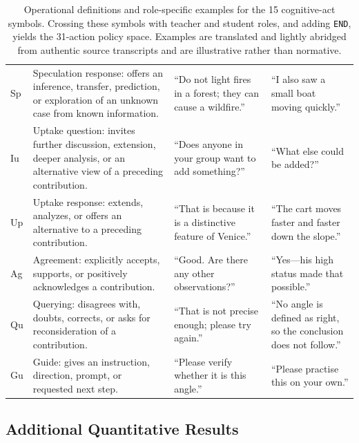 \documentclass[manuscript,review,anonymous]{acmart}
\begin{document}
\begin{table}[t]
\begin{tabularx}{\textwidth}{@{}l>{\raggedright\arraybackslash}p{}>{\raggedright\arraybackslash}p{}>{\raggedright\arraybackslash}X@{}}
Sp & Speculation response: offers an inference, transfer, prediction, or exploration of an unknown case from known information. & ``Do not light fires in a forest; they can cause a wildfire.'' & ``I also saw a small boat moving quickly.'' \\
Iu & Uptake question: invites further discussion, extension, deeper analysis, or an alternative view of a preceding contribution. & ``Does anyone in your group want to add something?'' & ``What else could be added?'' \\
Up & Uptake response: extends, analyzes, or offers an alternative to a preceding contribution. & ``That is because it is a distinctive feature of Venice.'' & ``The cart moves faster and faster down the slope.'' \\
Ag & Agreement: explicitly accepts, supports, or positively acknowledges a contribution. & ``Good. Are there any other observations?'' & ``Yes---his high status made that possible.'' \\
Qu & Querying: disagrees with, doubts, corrects, or asks for reconsideration of a contribution. & ``That is not precise enough; please try again.'' & ``No angle is defined as right, so the conclusion does not follow.'' \\
Gu & Guide: gives an instruction, direction, prompt, or requested next step. & ``Please verify whether it is this angle.'' & ``Please practise this on your own.'' \\
\bottomrule
\end{tabularx}
\caption{Operational definitions and role-specific examples for the 15
cognitive-act symbols. Crossing these symbols with teacher and student roles,
and adding \texttt{END}, yields the 31-action policy space. Examples are
translated and lightly abridged from authentic source transcripts and are
illustrative rather than normative.}
\label{tab:action-definitions}
\end{table}
\FloatBarrier

\subsection{Additional Quantitative Results}
\end{document}
